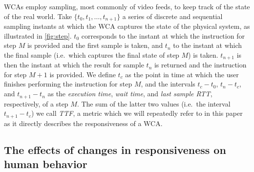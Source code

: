 \glspl{WCA} employ sampling, most commonly of video feeds, to keep track of the state of the real world.
Take \( \{ t_0, t_1, \ldots, t_{n + 1} \} \) a series of discrete and sequential sampling instants at which the \gls{WCA} captures the state of the physical system, as illustrated in \cref{fig:step}.
\( t_0 \) corresponds to the instant at which the instruction for step \( M \) is provided and the first sample is taken, and \( t_n \) to the instant at which the final sample (i.e.\ which captures the final state of step \( M \)) is taken. 
\( t_{n + 1} \) is then the instant at which the result for sample \( t_n \) is returned and the instruction for step \( M + 1 \) is provided.
We define \( t_c \) as the point in time at which the user finishes performing the instruction for step \( M \), and the intervals \( t_c - t_0 \), \( t_n - t_c \), and \( t_{n + 1} - t_n \) as the \emph{execution time}, \emph{wait time}, and \emph{last sample \gls{RTT}}, respectively, of a step \( M \).
The sum of the latter two values (i.e.\ the interval \( t_{n + 1} - t_c \)) we call \emph{\gls{TTF}}, a metric which we will repeatedly refer to in this paper as it directly describes the responsiveness of a \gls{WCA}.



\subsection{The effects of changes in responsiveness on human behavior}\label{ssec:plos}

